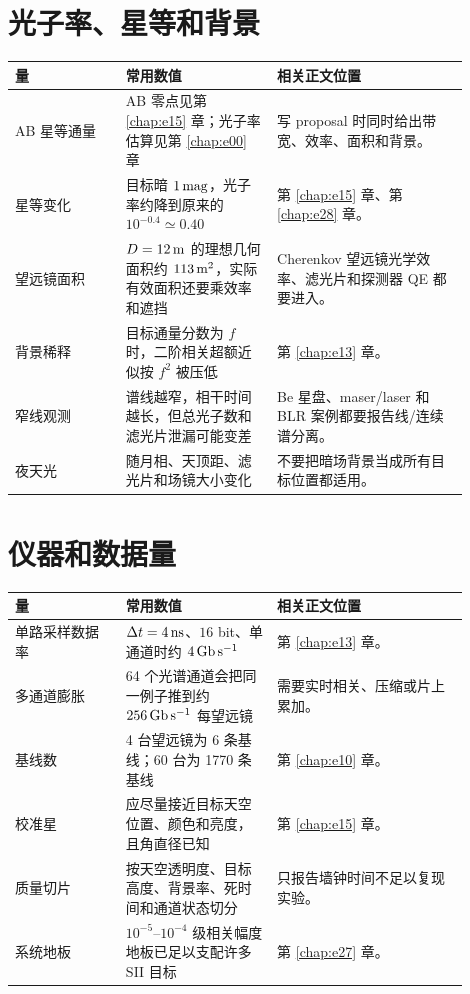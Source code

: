 \section{光子率、星等和背景}
\label{appsec:b-photon-rate}

\begin{longtable}{p{0.22\linewidth}p{0.30\linewidth}p{0.38\linewidth}}
\toprule
量 & 常用数值 & 相关正文位置 \\
\midrule
AB 星等通量 & AB 零点见第 \ref{chap:e15} 章；光子率估算见第 \ref{chap:e00} 章 & 写 proposal 时同时给出带宽、效率、面积和背景。 \\
星等变化 & 目标暗 \(1\,{\rm mag}\)，光子率约降到原来的 \(10^{-0.4}\simeq0.40\) & 第 \ref{chap:e15} 章、第 \ref{chap:e28} 章。 \\
望远镜面积 & \(D=12\,{\rm m}\) 的理想几何面积约 \(113\,{\rm m^2}\)，实际有效面积还要乘效率和遮挡 & Cherenkov 望远镜光学效率、滤光片和探测器 QE 都要进入。 \\
背景稀释 & 目标通量分数为 \(f\) 时，二阶相关超额近似按 \(f^2\) 被压低 & 第 \ref{chap:e13} 章。 \\
窄线观测 & 谱线越窄，相干时间越长，但总光子数和滤光片泄漏可能变差 & Be 星盘、maser/laser 和 BLR 案例都要报告线/连续谱分离。 \\
夜天光 & 随月相、天顶距、滤光片和场镜大小变化 & 不要把暗场背景当成所有目标位置都适用。 \\
\bottomrule
\end{longtable}

\section{仪器和数据量}
\label{appsec:b-instrument}

\begin{longtable}{p{0.22\linewidth}p{0.30\linewidth}p{0.38\linewidth}}
\toprule
量 & 常用数值 & 相关正文位置 \\
\midrule
单路采样数据率 & \(\Delta t=4\,{\rm ns}\)、\(16\) bit、单通道时约 \(4\,{\rm Gb\,s^{-1}}\) & 第 \ref{chap:e13} 章。 \\
多通道膨胀 & 64 个光谱通道会把同一例子推到约 \(256\,{\rm Gb\,s^{-1}}\) 每望远镜 & 需要实时相关、压缩或片上累加。 \\
基线数 & 4 台望远镜为 6 条基线；60 台为 1770 条基线 & 第 \ref{chap:e10} 章。 \\
校准星 & 应尽量接近目标天空位置、颜色和亮度，且角直径已知 & 第 \ref{chap:e15} 章。 \\
质量切片 & 按天空透明度、目标高度、背景率、死时间和通道状态切分 & 只报告墙钟时间不足以复现实验。 \\
系统地板 & \(10^{-5}\)--\(10^{-4}\) 级相关幅度地板已足以支配许多 SII 目标 & 第 \ref{chap:e27} 章。 \\
\bottomrule
\end{longtable}

